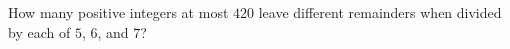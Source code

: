 How many positive integers at most $420$ leave different remainders when divided by each of $5$, $6$, and $7$?

